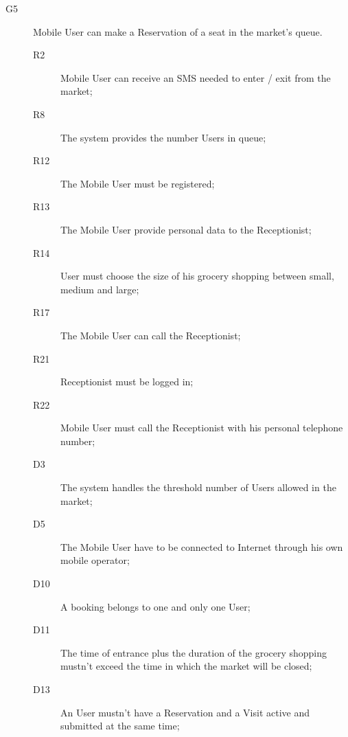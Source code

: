 \begin{description}
    \item[G5]Mobile User can make a Reservation of a seat in the market's queue.
    \begin{description}
    \item[R2] Mobile User can receive an SMS needed to enter / exit from the market;   %
    \item[R8] The system provides the number Users in queue; %
    \item[R12] The Mobile User must be registered; %
    \item[R13] The Mobile User provide personal data to the Receptionist; %
    \item[R14] User must choose the size of his grocery shopping between small, medium and large;
    \item[R17] The Mobile User can call the Receptionist; 
    \item[R21] Receptionist must be logged in;
    \item[R22] Mobile User must call the Receptionist with his personal telephone number;
    \item[D3] The system handles the threshold number of Users allowed in the market;
    \item[D5] The Mobile User have to be connected to Internet through his own mobile operator;
    \item[D10] A booking belongs to one and only one User;
    \item[D11] The time of entrance plus the duration of the grocery shopping mustn’t exceed the time in which the market will be closed; 
    \item[D13] An User mustn’t have a Reservation and a Visit active and submitted at the same time;     
    \end{description}
    

\end{description}
